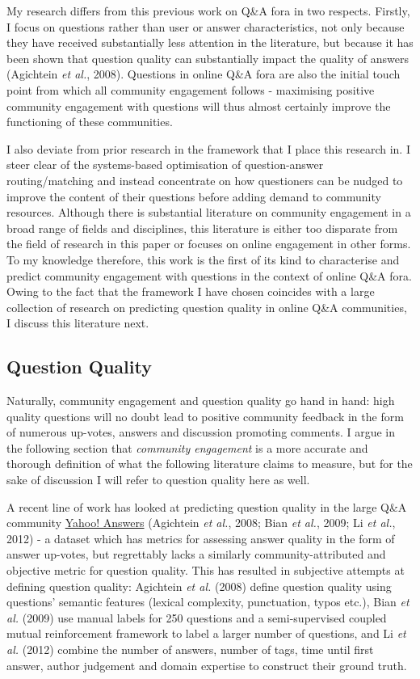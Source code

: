 \documentclass[11pt,preprint, authoryear]{article}
\begin{document}
My research differs from this previous work on Q\&A fora in two
respects. Firstly, I focus on questions rather than user or answer
characteristics, not only because they have received substantially less
attention in the literature, but because it has been shown that question
quality can substantially impact the quality of answers (Agichtein
\emph{et al.}, 2008). Questions in online Q\&A fora are also the initial
touch point from which all community engagement follows - maximising
positive community engagement with questions will thus almost certainly
improve the functioning of these communities.

I also deviate from prior research in the framework that I place this
research in. I steer clear of the systems-based optimisation of
question-answer routing/matching and instead concentrate on how
questioners can be nudged to improve the content of their questions
before adding demand to community resources. Although there is
substantial literature on community engagement in a broad range of
fields and disciplines, this literature is either too disparate from the
field of research in this paper or focuses on online engagement in other
forms. To my knowledge therefore, this work is the first of its kind to
characterise and predict community engagement with questions in the
context of online Q\&A fora. Owing to the fact that the framework I have
chosen coincides with a large collection of research on predicting
question quality in online Q\&A communities, I discuss this literature
next.

\subsection{\texorpdfstring{Question Quality
\label{qquality}}{Question Quality }}\label{question-quality}

Naturally, community engagement and question quality go hand in hand:
high quality questions will no doubt lead to positive community feedback
in the form of numerous up-votes, answers and discussion promoting
comments. I argue in the following section that \emph{community
engagement} is a more accurate and thorough definition of what the
following literature claims to measure, but for the sake of discussion I
will refer to question quality here as well.

A recent line of work has looked at predicting question quality in the
large Q\&A community \href{http://answers.yahoo.com}{Yahoo! Answers}
(Agichtein \emph{et al.}, 2008; Bian \emph{et al.}, 2009; Li \emph{et
al.}, 2012) - a dataset which has metrics for assessing answer quality
in the form of answer up-votes, but regrettably lacks a similarly
community-attributed and objective metric for question quality. This has
resulted in subjective attempts at defining question quality: Agichtein
\emph{et al.} (2008) define question quality using questions' semantic
features (lexical complexity, punctuation, typos etc.), Bian \emph{et
al.} (2009) use manual labels for 250 questions and a semi-supervised
coupled mutual reinforcement framework to label a larger number of
questions, and Li \emph{et al.} (2012) combine the number of answers,
number of tags, time until first answer, author judgement and domain
expertise to construct their ground truth.
\end{document}
